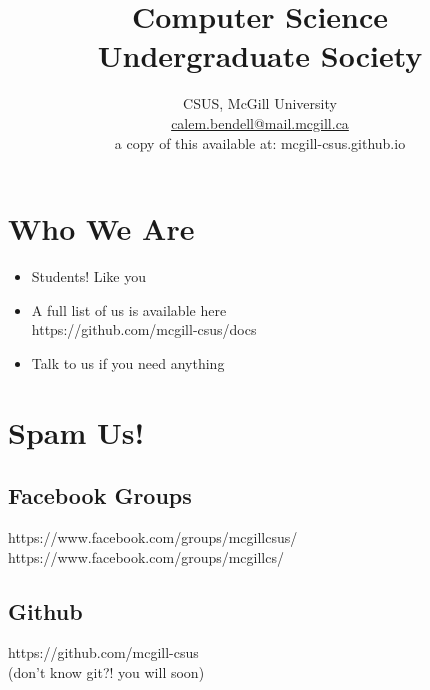

\title{Computer Science \\ Undergraduate Society \vspace*{1em}}
\author{
\large
CSUS, McGill University \\
\normalsize \href{mailto:calem.bendell@mail.mcgill.ca}{calem.bendell@mail.mcgill.ca} \\
a copy of this available at: mcgill-csus.github.io
}
\date{}



\maketitle

\clearpage

\section{Who We Are}

\begin{itemize}
	\item Students!  Like you
	\item A full list of us is available here \\ https://github.com/mcgill-csus/docs
	\item Talk to us if you need anything
\end{itemize}

\clearpage

\section{Spam Us!}

	\subsection{Facebook Groups}
		
		https://www.facebook.com/groups/mcgillcsus/ \\
		https://www.facebook.com/groups/mcgillcs/
		
	\subsection{Github}
	
		https://github.com/mcgill-csus \\
		(don't know git?!  you will soon)

\clearpage

